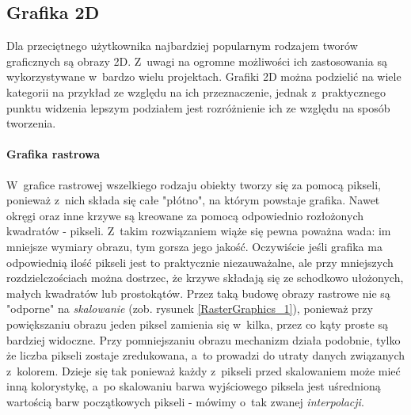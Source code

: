 \documentclass[12pt,a4paper,oneside]{book}
\theoremstyle{definition}
\numberwithin{equation}{chapter}
\begin{document}
\subsection{Grafika 2D}

\par Dla przeciętnego użytkownika najbardziej popularnym rodzajem tworów graficznych są obrazy 2D. Z~uwagi na ogromne możliwości ich zastosowania są wykorzystywane w~bardzo wielu projektach. Grafiki 2D można podzielić na wiele kategorii na przykład ze względu na ich przeznaczenie, jednak z~praktycznego punktu widzenia lepszym podziałem jest rozróżnienie ich ze względu na sposób tworzenia.

\paragraph{Grafika rastrowa}\hfill \break

\par W~grafice rastrowej wszelkiego rodzaju obiekty tworzy się za pomocą pikseli, ponieważ z~nich składa się całe "płótno", na którym powstaje grafika. Nawet okręgi oraz inne krzywe są kreowane za pomocą odpowiednio rozłożonych kwadratów - pikseli. Z~takim rozwiązaniem wiąże się pewna poważna wada: im mniejsze wymiary obrazu, tym gorsza jego jakość. Oczywiście jeśli grafika ma odpowiednią ilość pikseli jest to praktycznie niezauważalne, ale przy mniejszych rozdzielczościach można dostrzec, że krzywe składają się ze schodkowo ułożonych, małych kwadratów lub prostokątów. Przez taką budowę obrazy rastrowe nie są "odporne" na \textit{skalowanie} (zob. rysunek \ref{RasterGraphics_1}), ponieważ przy powiększaniu obrazu jeden piksel zamienia się w~kilka, przez co kąty proste są bardziej widoczne. Przy pomniejszaniu obrazu mechanizm działa podobnie, tylko że liczba pikseli zostaje zredukowana, a~to prowadzi do utraty danych związanych z~kolorem. Dzieje się tak ponieważ każdy z~pikseli przed skalowaniem może mieć inną kolorystykę, a~po skalowaniu barwa wyjściowego piksela jest uśrednioną wartością barw początkowych pikseli - mówimy o~tak zwanej \textit{interpolacji}.
\end{document}
